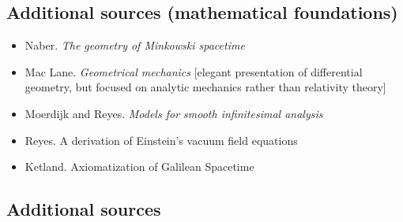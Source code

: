 \documentclass[11pt]{article}
\begin{document}
\subsection*{Additional sources (mathematical foundations)}

\begin{itemize}
\item Naber. \emph{The geometry of Minkowski spacetime}
\item Mac Lane. \emph{Geometrical mechanics} [elegant presentation of
  differential geometry, but focused on analytic mechanics rather than
  relativity theory]
\item Moerdijk and Reyes. \textit{Models for smooth infinitesimal
    analysis}
\item Reyes. A derivation of Einstein's vacuum field equations
\item Ketland. Axiomatization of Galilean Spacetime  
\end{itemize}

\subsection*{Additional sources}
\end{document}
